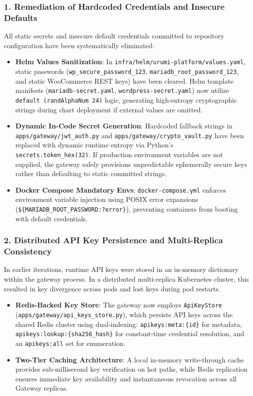 \documentclass[11pt,a4paper]{article}
\begin{document}
\subsubsection{1. Remediation of Hardcoded Credentials and Insecure Defaults}
All static secrets and insecure default credentials committed to repository configuration have been systematically eliminated:
\begin{itemize}[leftmargin=*]
    \item \textbf{Helm Values Sanitization}: In \texttt{infra/helm/urumi-platform/values.yaml}, static passwords (\texttt{wp\_secure\_password\_123}, \texttt{mariadb\_root\_password\_123}, and static WooCommerce REST keys) have been cleared. Helm template manifests (\texttt{mariadb-secret.yaml}, \texttt{wordpress-secret.yaml}) now utilize \texttt{default (randAlphaNum 24)} logic, generating high-entropy cryptographic strings during chart deployment if external values are omitted.
    \item \textbf{Dynamic In-Code Secret Generation}: Hardcoded fallback strings in \texttt{apps/gateway/jwt\_auth.py} and \texttt{apps/gateway/crypto\_vault.py} have been replaced with dynamic runtime entropy via Python's \texttt{secrets.token\_hex(32)}. If production environment variables are not supplied, the gateway safely provisions unpredictable ephemerally secure keys rather than defaulting to static committed strings.
    \item \textbf{Docker Compose Mandatory Envs}: \texttt{docker-compose.yml} enforces environment variable injection using POSIX error expansions (\texttt{\$\{MARIADB\_ROOT\_PASSWORD:?error\}}), preventing containers from booting with default credentials.
\end{itemize}

\subsubsection{2. Distributed API Key Persistence and Multi-Replica Consistency}
In earlier iterations, runtime API keys were stored in an in-memory dictionary within the gateway process. In a distributed multi-replica Kubernetes cluster, this resulted in key divergence across pods and lost keys during pod restarts.
\begin{itemize}[leftmargin=*]
    \item \textbf{Redis-Backed Key Store}: The gateway now employs \texttt{ApiKeyStore} (\texttt{apps/gateway/api\_keys\_store.py}), which persists API keys across the shared Redis cluster using dual-indexing: \texttt{apikeys:meta:\{id\}} for metadata, \texttt{apikeys:lookup:\{sha256\_hash\}} for constant-time credential resolution, and an \texttt{apikeys:all} set for enumeration.
    \item \textbf{Two-Tier Caching Architecture}: A local in-memory write-through cache provides sub-millisecond key verification on hot paths, while Redis replication ensures immediate key availability and instantaneous revocation across all Gateway replicas.
\end{itemize}
\end{document}
